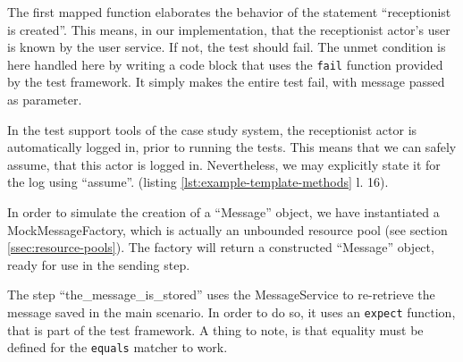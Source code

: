 \noindent The first mapped function elaborates the behavior of the statement ``receptionist is created''. This means, in our implementation, that the receptionist actor's user is known by the user service. If not, the test should fail. The unmet condition is here handled here by writing a code block that uses the \texttt{fail} function provided by the test framework. It simply makes the entire test fail, with message passed as parameter.\medskip

\noindent In the test support tools of the case study system, the receptionist actor is automatically logged in, prior to running the tests. This means that we can safely assume, that this actor is logged in. Nevertheless, we may explicitly state it for the log using ``assume''. (listing \ref{lst:example-template-methods} l. 16).\medskip

\noindent In order to simulate the creation of a ``Message'' object, we have instantiated a MockMessageFactory, which is actually an unbounded resource pool (see section \ref{ssec:resource-pools}). The factory will return a constructed ``Message'' object, ready for use in the sending step.\medskip

\noindent The step ``the\_message\_is\_stored'' uses the MessageService to re-retrieve the message saved in the main scenario. In order to do so, it uses an \texttt{expect} function, that is part of the test framework. A thing to note, is that equality must be defined for the \texttt{equals} matcher to work.\medskip


